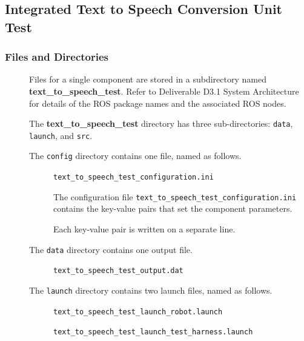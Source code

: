 \documentclass{CSSRforAfrica}
\newcommand{\checkboxChecked}{\fbox{\ding{51}}} %
\newcommand{\checkboxDashed}{\fbox{--}}         %
\begin{document}
\subsection{Integrated Text to Speech Conversion Unit Test}

\subsubsection{Files and Directories}

\begin{description}

\item[\checkboxChecked] Files for a single component are stored in a subdirectory named \textbf{text\_to\_speech\_test}. Refer to Deliverable D3.1 System Architecture for details of the ROS package names and the associated ROS nodes.

\item[\checkboxChecked] The \textbf{text\_to\_speech\_test} directory has three sub-directories: {\small \verb+data+}, {\small \verb+launch+}, and {\small \verb+src+}.

\item[\checkboxDashed] The  {\small \verb+config+} directory contains one file, named as follows.

\begin{description}
\item[\checkboxDashed] {\small  \texttt{text\_to\_speech\_test\_configuration.ini}}  
\item[\checkboxDashed] The configuration file {\small \verb+text_to_speech_test_configuration.ini+} contains the key-value pairs that set the component parameters.  
\item[\checkboxDashed] Each key-value pair is written on a separate line.
\end{description}

 
\item[\checkboxChecked] The  {\small \texttt{data}} directory contains one output file.
\begin{description} 
\item[\checkboxChecked] {\small \texttt{text\_to\_speech\_test\_output.dat}}
\end{description}

\item[\checkboxChecked] The  {\small \verb+launch+} directory contains two launch files, named as follows.
\begin{description}
\item[\checkboxChecked] {\small \verb+text_to_speech_test_launch_robot.launch+}  
\item[\checkboxChecked]  {\small \verb+text_to_speech_test_launch_test_harness.launch+}  
\end{description}


\end{description}
\end{document}

